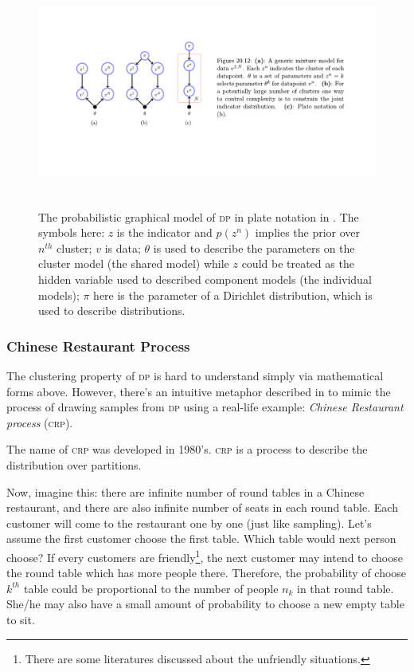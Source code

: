 \documentclass{ar-1col}
\begin{document}
\begin{figure}
    \includegraphics[width=6in, height=3in]{images/Dirichlet.pdf}
    \caption{The probabilistic graphical model of \textsc{dp} in plate notation in \citet{Barber2012}. The symbols here: $z$ is the indicator and $p(z^n)$ implies the prior over $n^{th}$ cluster; $v$ is data; $\theta$ is used to describe the parameters on the cluster model (the shared model) while $z$ could be treated as the hidden variable used to described component models (the individual models); $\pi$ here is the parameter of a Dirichlet distribution, which is used to describe distributions.}
    \label{fig:Dirichlet}
\end{figure}


\subsubsection{Chinese Restaurant Process}

The clustering property of \textsc{dp} is hard to understand simply via mathematical forms above. 
However, there's an intuitive metaphor described in \citet{Teh2006} to mimic the process of drawing samples from \textsc{dp} using a real-life example: \textit{Chinese Restaurant process} (\textsc{crp}).

The name of \textsc{crp} was developed in 1980's. 
\textsc{crp} is a process to describe the distribution over partitions.

Now, imagine this: there are infinite number of round tables in a Chinese restaurant, and there are also infinite number of seats in each round table. 
Each customer will come to the restaurant one by one (just like sampling). 
Let's assume the first customer choose the first table.
Which table would next person choose?
If every customers are friendly\footnote{There are some literatures discussed about the unfriendly situations.}, the next customer may intend to choose the round table which has more people there.
Therefore, the probability of choose $k^{th}$ table could be proportional to the number of people $n_k$ in that round table.
She/he may also have a small amount of probability to choose a new empty table to sit.
\end{document}
